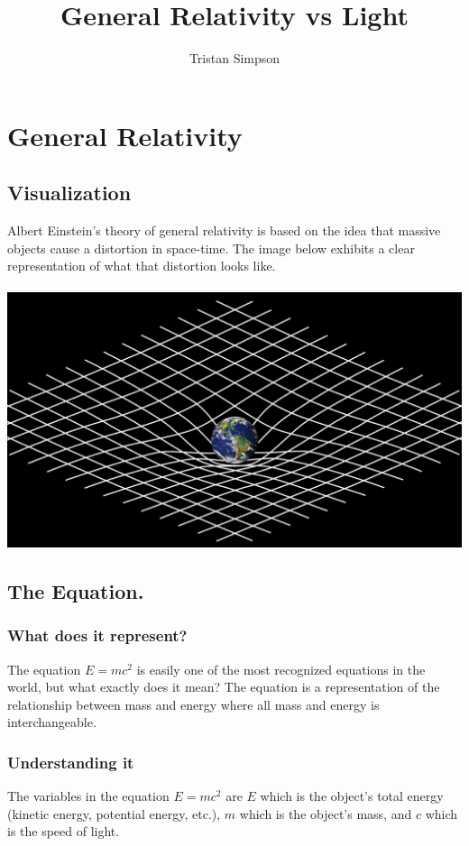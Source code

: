 \documentclass{article}
\title{General Relativity vs Light}
\author{Tristan Simpson}
\begin{document}
\maketitle
\tableofcontents
\section{General Relativity}\label{sec:generalrelativity}
\subsection{Visualization}
Albert Einstein's theory of general relativity is based on the idea that massive objects cause a distortion in space-time. The image below exhibits a clear representation of what that distortion looks like.\\\\
\includegraphics[scale=0.30]{images/general_relativity.png}

\subsection{The Equation.}
\subsubsection{What does it represent?}
The equation $E = mc^2$ is easily one of the most recognized equations in the world, but what exactly does it mean? The equation is a representation of the relationship between mass and energy where all mass and energy is interchangeable.

\subsubsection{Understanding it}
The variables in the equation $E = mc^2$ are $E$ which is the object's total energy (kinetic energy, potential energy, etc.), $m$ which is the object's mass, and $c$ which is the speed of light.
\end{document}
